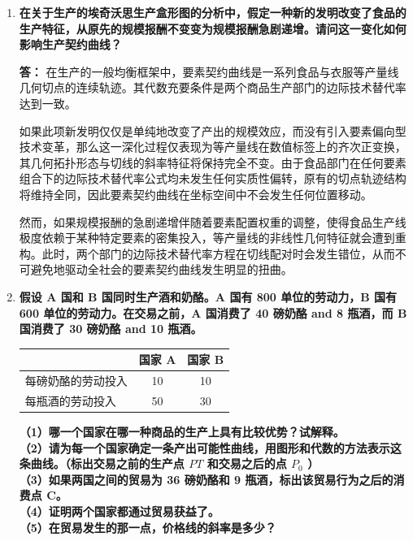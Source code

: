 \begin{enumerate}[label=\textbf{\arabic*.}, leftmargin=*]
\begin{center}
		\end{center}
		
		\item \textbf{在关于生产的埃奇沃思生产盒形图的分析中，假定一种新的发明改变了食品的生产特征，从原先的规模报酬不变变为规模报酬急剧递增。请问这一变化如何影响生产契约曲线？}
		
		\textbf{答：}
		在生产的一般均衡框架中，要素契约曲线是一系列食品与衣服等产量线几何切点的连续轨迹。其代数充要条件是两个商品生产部门的边际技术替代率达到一致。
		
		如果此项新发明仅仅是单纯地改变了产出的规模效应，而没有引入要素偏向型技术变革，那么这一深化过程仅表现为等产量线在数值标签上的齐次正变换，其几何拓扑形态与切线的斜率特征将保持完全不变。由于食品部门在任何要素组合下的边际技术替代率公式均未发生任何实质性偏转，原有的切点轨迹结构将维持全同，因此要素契约曲线在坐标空间中不会发生任何位置移动。
		
		然而，如果规模报酬的急剧递增伴随着要素配置权重的调整，使得食品生产线极度依赖于某种特定要素的密集投入，等产量线的非线性几何特征就会遭到重构。此时，两个部门的边际技术替代率方程在切线配对时会发生错位，从而不可避免地驱动全社会的要素契约曲线发生明显的扭曲。
		\newpage
		\item \textbf{假设 A 国和 B 国同时生产酒和奶酪。A 国有 800 单位的劳动力，B 国有 600 单位的劳动力。在交易之前，A 国消费了 40 磅奶酪 and 8 瓶酒，而 B 国消费了 30 磅奶酪 and 10 瓶酒。}
		\begin{center}
			\small
			\renewcommand{\arraystretch}{1.2}
			\setlength{\tabcolsep}{8pt}
			\begin{tabular}{lcc}
				\hline
				& 国家 A & 国家 B \\ \hline
				每磅奶酪的劳动投入 & 10 & 10 \\
				每瓶酒的劳动投入 & 50 & 30 \\ \hline
			\end{tabular}
		\end{center}
		\textbf{（1）哪一个国家在哪一种商品的生产上具有比较优势？试解释。\\（2）请为每一个国家确定一条产出可能性曲线，用图形和代数的方法表示这条曲线。（标出交易之前的生产点 $PT$ 和交易之后的点 $P_{0}$ ）\\（3）如果两国之间的贸易为 36 磅奶酪和 9 瓶酒，标出该贸易行为之后的消费点 C。\\（4）证明两个国家都通过贸易获益了。\\（5）在贸易发生的那一点，价格线的斜率是多少？}
		

\end{enumerate}
